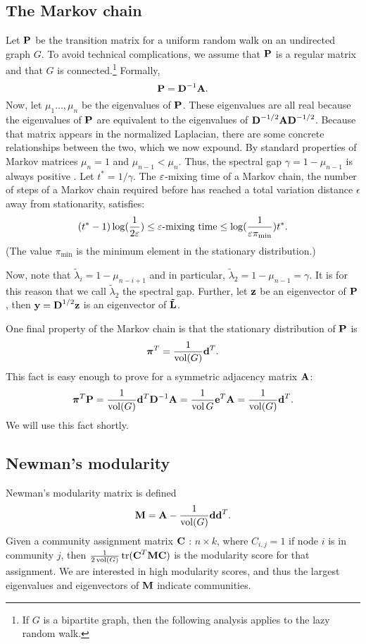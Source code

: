 \documentclass[nofonts]{dgleich-article}
\DeclareMathOperator{\trace}{tr}
\DeclareMathOperator{\vol}{vol}
\newcommand{\mnL}{\mat{\tilde{L}}}
\newcommand{\tlambda}{\tilde{\lambda}}
\renewcommand{\vpi}{\vec{\pi}}
\begin{document}
\subsection{The Markov chain}
Let $\boldsymbol{\mathrm{P}}$ be the transition matrix for a uniform random walk on an undirected graph $G$.  To avoid
technical complications, we assume that $\boldsymbol{\mathrm{P}}$ is a regular matrix and that $G$ 
is connected.\footnote{If $G$ is a bipartite graph, then the following analysis applies
to the lazy random walk.}
Formally, 
\[ \boldsymbol{\mathrm{P}} = \boldsymbol{\mathrm{D}}^{-1} \boldsymbol{\mathrm{A}}. \]
Now, let $\mu_1 \ldots, \mu_n$ be the eigenvalues of $\boldsymbol{\mathrm{P}}$.  These eigenvalues are all
real because the eigenvalues of $\boldsymbol{\mathrm{P}}$ are equivalent to the eigenvalues of 
$\boldsymbol{\mathrm{D}}^{-1/2} \boldsymbol{\mathrm{A}} \boldsymbol{\mathrm{D}}^{-1/2}$.  Because that matrix appears in the normalized Laplacian, there 
are some concrete relationships between the two, which we now expound. By standard properties
of Markov matrices $\mu_n = 1$ and $\mu_{n-1} < \mu_n$.  Thus,
the spectral gap $\gamma = 1-\mu_{n-1}$ is always positive \cite{levin2008-markov}.  Let $t^* = 1/\gamma$.
The $\varepsilon$-mixing time of a Markov chain, the number of steps of a Markov chain required before
has reached a total variation distance $\epsilon$ away from stationarity, satisfies: 
\[ (t^* -1) \log( \frac{1}{2\varepsilon} ) \le \varepsilon\text{-mixing time} 
     \le \log (\frac{1}{\varepsilon \pi_{\text{min}} }) t^{*}. \]
(The value $ \pi_{\text{min}}$ is the minimum element in the stationary distribution.)

Now, note that $\tlambda_i = 1 - \mu_{n-i+1}$ and in particular, $\tlambda_2 = 1 - \mu_{n-1} = \gamma$. 
It is for this reason that we call $\tlambda_2$ the spectral gap.  
Further, let $\boldsymbol{\mathrm{z}}$ be an eigenvector of $\boldsymbol{\mathrm{P}}$, then 
$\boldsymbol{\mathrm{y}} = \boldsymbol{\mathrm{D}}^{1/2} \boldsymbol{\mathrm{z}}$ is an eigenvector of $\mnL$.  

One final property of the Markov chain is that the stationary distribution of 
$\boldsymbol{\mathrm{P}}$ is \[ \vpi^T = \frac{1}{\vol(G)} \vd^T. \]
This fact is easy enough to prove for a symmetric adjacency matrix $\boldsymbol{\mathrm{A}}$:
\[ \vpi^T \mP = \frac{1}{\vol(G)} \vd^T \mD^{-1} \mA = \frac{1}{\vol{G}} \ve^T \mA = \frac{1}{\vol(G)} \vd^T. \]
We will use this fact shortly.

\subsection{Newman's modularity}

Newman's modularity matrix is defined 
\[ \mM = \mA - \frac{1}{\vol(G)} \vd \vd^T. \]
Given a community assignment matrix 
$\boldsymbol{\mathrm{C}}$ : $n \times k$, where $C_{i,j} = 1$ if node $i$ is in community
$j$, then $\frac{1}{2 \vol(G)} \trace ( \mC^T \mM \mC )$ is the
modularity score for that assignment.  We are interested
in high modularity scores, and thus the largest eigenvalues
and eigenvectors of $\boldsymbol{\mathrm{M}}$ indicate communities.  
\end{document}
